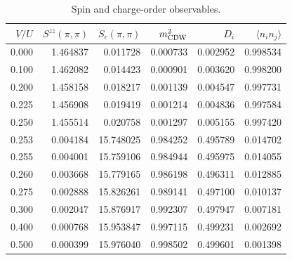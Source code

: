 \documentclass[10pt]{article}
\begin{document}
\begin{table}[!htbp]
\centering\scriptsize
\caption{Spin and charge-order observables.}
\begin{tabular}{rrrrrr}
\toprule
$V/U$ & $S^{zz}(\pi,\pi)$ & $S_c(\pi,\pi)$ & $m_{\rm CDW}^2$ & $D_i$ &
$\langle n_i n_j\rangle$\\
\midrule
0.000 & 1.464837 & 0.011728 & 0.000733 & 0.002952 & 0.998534 \\
0.100 & 1.462082 & 0.014423 & 0.000901 & 0.003620 & 0.998200 \\
0.200 & 1.458158 & 0.018217 & 0.001139 & 0.004547 & 0.997731 \\
0.225 & 1.456908 & 0.019419 & 0.001214 & 0.004836 & 0.997584 \\
0.250 & 1.455514 & 0.020758 & 0.001297 & 0.005155 & 0.997420 \\
0.253 & 0.004184 & 15.748025 & 0.984252 & 0.495789 & 0.014702 \\
0.255 & 0.004001 & 15.759106 & 0.984944 & 0.495975 & 0.014055 \\
0.260 & 0.003668 & 15.779165 & 0.986198 & 0.496311 & 0.012885 \\
0.275 & 0.002888 & 15.826261 & 0.989141 & 0.497100 & 0.010137 \\
0.300 & 0.002047 & 15.876917 & 0.992307 & 0.497947 & 0.007181 \\
0.400 & 0.000768 & 15.953847 & 0.997115 & 0.499231 & 0.002692 \\
0.500 & 0.000399 & 15.976040 & 0.998502 & 0.499601 & 0.001398 \\
\bottomrule
\end{tabular}
\end{table}
\end{document}
